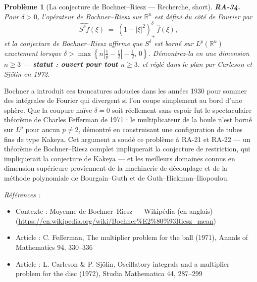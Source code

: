 \documentclass[11pt]{article}
\newtheorem{problem}{Problème}
\newenvironment{refs}{\par\small\noindent\emph{Références :}\begin{itemize}\setlength\itemsep{0pt}}{\end{itemize}\normalsize}
\begin{document}
\bigskip

\begin{problem}[{La conjecture de Bochner--Riesz --- Recherche, short}]
\textbf{RA-34.} Pour $ \delta > 0 $, l'opérateur de Bochner--Riesz sur
$ \mathbb{R}^n $ est défini du côté de Fourier par
\[ \widehat{S^{\delta} f}(\xi) \;=\; \left( 1 - |\xi|^2 \right)_{+}^{\delta} \, \hat{f}(\xi), \]
et la conjecture de Bochner--Riesz affirme que $ S^{\delta} $ est borné sur
$ L^p(\mathbb{R}^n) $ exactement lorsque
$ \delta > \max \left\{ n \left| \tfrac{1}{p} - \tfrac{1}{2} \right| - \tfrac{1}{2},\, 0
\right\} $. Démontrez-la en une dimension $ n \ge 3 $ --- \textbf{statut : ouvert pour tout
$ n \ge 3 $}, et réglé dans le plan par Carleson et Sjölin en 1972.
\end{problem}

\noindent Bochner a introduit ces troncatures adoucies dans les années 1930 pour sommer des
intégrales de Fourier qui divergent si l'on coupe simplement au bord d'une sphère. Que la coupure
naïve $ \delta = 0 $ soit réellement sans espoir fut le spectaculaire théorème de Charles Fefferman
de 1971 : le multiplicateur de la boule n'est borné sur $ L^p $ pour aucun $ p \ne 2 $,
démontré en construisant une configuration de tubes fins de type Kakeya. Cet argument a soudé ce
problème à RA-21 et RA-22 --- un théorème de Bochner--Riesz complet impliquerait la conjecture de
restriction, qui impliquerait la conjecture de Kakeya --- et les meilleurs domaines connus en
dimension supérieure proviennent de la machinerie de découplage et de la méthode polynomiale de
Bourgain--Guth et de Guth--Hickman--Iliopoulou.

\begin{refs}
\item Contexte : Moyenne de Bochner--Riesz --- Wikipédia (en anglais) (\url{https://en.wikipedia.org/wiki/Bochner%E2%80%93Riesz_mean})
\item Article : C. Fefferman, \og{} The multiplier problem for the ball \fg{} (1971), Annals of Mathematics 94, 330--336
\item Article : L. Carleson \& P. Sjölin, \og{} Oscillatory integrals and a multiplier problem for the disc \fg{} (1972), Studia Mathematica 44, 287--299
\end{refs}

\bigskip
\end{document}
